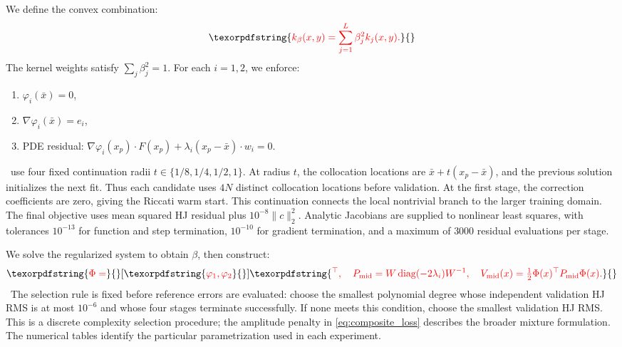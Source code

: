 \documentclass[11pt]{article}
\theoremstyle{plain}      %
\theoremstyle{definition} %
\providecommand{\DIFaddtex}[1]{{\protect\color{blue}#1}} %
\providecommand{\DIFdeltex}[1]{{\protect\color{red}#1}} %
\providecommand{\DIFaddbegin}{} %
\providecommand{\DIFaddend}{} %
\providecommand{\DIFdelbegin}{} %
\providecommand{\DIFdelend}{} %
\providecommand{\DIFadd}[1]{\texorpdfstring{\DIFaddtex{#1}}{#1}} %
\providecommand{\DIFdel}[1]{\texorpdfstring{\DIFdeltex{#1}}{}} %
\newcommand{\DIFscaledelfig}{1.0}
\newlength{\DIFdelgraphicswidth} %
\newlength{\DIFdelgraphicsheight} %
\newcommand{\DIFaddincludegraphics}[2][]{{\color{blue}\fbox{\DIFOincludegraphics[#1]{#2}}}} %
\newcommand{\DIFdelincludegraphics}[2][]{%
\sbox{\DIFdelgraphicsbox}{\DIFOincludegraphics[#1]{#2}}%
\settoboxwidth{\DIFdelgraphicswidth}{\DIFdelgraphicsbox} %
\settoboxtotalheight{\DIFdelgraphicsheight}{\DIFdelgraphicsbox} %
\scalebox{\DIFscaledelfig}{%
\parbox[b]{\DIFdelgraphicswidth}{\usebox{\DIFdelgraphicsbox}\\[-\baselineskip] \rule{\DIFdelgraphicswidth}{0em}}\llap{\resizebox{\DIFdelgraphicswidth}{\DIFdelgraphicsheight}{%
\setlength{\unitlength}{\DIFdelgraphicswidth}%
\begin{picture}(1,1)%
\thicklines\linethickness{2pt} %
{\color[rgb]{1,0,0}\put(0,0){\framebox(1,1){}}}%
{\color[rgb]{1,0,0}\put(0,0){\line( 1,1){1}}}%
{\color[rgb]{1,0,0}\put(0,1){\line(1,-1){1}}}%
\end{picture}%
}\hspace*{3pt}}} %
} %
\DeclareRobustCommand{\DIFaddbegin}{\DIFOaddbegin \let\includegraphics\DIFaddincludegraphics} %
\DeclareRobustCommand{\DIFaddend}{\DIFOaddend \let\includegraphics\DIFOincludegraphics} %
\DeclareRobustCommand{\DIFdelbegin}{\DIFOdelbegin \let\includegraphics\DIFdelincludegraphics} %
\DeclareRobustCommand{\DIFdelend}{\DIFOaddend \let\includegraphics\DIFOincludegraphics} %
\begin{document}
We \DIFdelbegin \DIFdel{define the convex combination:
}\[
\DIFdel{k_\beta(x, y) = \sum_{j=1}^L \beta_j^2 k_j(x, y).
}\]%
\DIFdel{The kernel weights satisfy $\sum_j \beta_j^2 = 1$. For each \( i = 1, 2 \), we enforce:
}%
\begin{enumerate}%
\item%
\DIFdel{\( \varphi_i(\bar x) = 0 \), }%
\item%
\DIFdel{\( \nabla \varphi_i(\bar x) = e_i \),
  }%
\item%
\DIFdel{PDE residual: \( \nabla \varphi_i(x_p) \cdot F(x_p) + \lambda_i (x_p - \bar x) \cdot w_i = 0 \). }
\end{enumerate}%
\DIFdelend\ \DIFaddbegin \DIFadd{use four fixed continuation radii $t\in\{1/8,1/4,1/2,1\}$. At radius $t$, the collocation locations are $\bar x+t(x_p-\bar x)$, and the previous solution initializes the next fit. Thus each candidate uses $4N$ distinct collocation locations before validation. At the first stage, the correction coefficients are zero, giving the Riccati warm start. This continuation connects the local nontrivial branch to the larger training domain. The final objective uses mean squared HJ residual plus $10^{-8}\|c\|_2^2$. Analytic Jacobians are supplied to nonlinear least squares, with tolerances $10^{-13}$ for function and step termination, $10^{-10}$ for gradient termination, and a maximum of $3000$ residual evaluations per stage.
}\DIFaddend 

\DIFdelbegin \DIFdel{We solve the regularized system to obtain \( \beta \), then construct:
}\[
\DIFdel{\Phi = }[\DIFdel{\varphi_1, \varphi_2}]\DIFdel{^\top, \quad
P_{\mathrm{mid}} = W\,\mathrm{diag}(-2\lambda_i)W^{-1}, \quad
V_{\mathrm{mid}}(x) = \tfrac12 \Phi(x)^\top P_{\mathrm{mid}} \Phi(x).
}\]%
\DIFdelend\ \DIFaddbegin \DIFadd{The selection rule is fixed before reference errors are evaluated: choose the smallest polynomial degree whose independent validation HJ RMS is at most $10^{-6}$ and whose four stages terminate successfully. If none meets this condition, choose the smallest validation HJ RMS. This is a discrete complexity selection procedure; the amplitude penalty in \eqref{eq:composite_loss} describes the broader mixture formulation. The numerical tables identify the particular parametrization used in each experiment.
}
\end{document}
